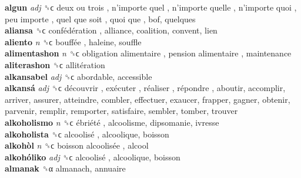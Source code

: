 \textbf{algun} \emph{adj}  ␝ϲ   deux ou trois ,  n’importe quel ,  n’importe quelle ,  n’importe quoi ,  peu importe ,  quel que soit ,  quoi que , bof, quelques  \\
\textbf{aliansa} ␝ϲ   confédération , alliance, coalition, convent, lien  \\
\textbf{aliento} \emph{n}  ␝ϲ   bouffée , haleine, souffle  \\
\textbf{alimentashon} \emph{n}  ␝ϲ   obligation alimentaire ,  pension alimentaire , maintenance  \\
\textbf{aliterashon} ␝ϲ   allitération   \\
\textbf{alkansabel} \emph{adj}  ␝ϲ  abordable, accessible  \\
\textbf{alkansá} \emph{adj}  ␝ϲ   découvrir ,  exécuter ,  réaliser ,  répondre , aboutir, accomplir, arriver, assurer, atteindre, combler, effectuer, exaucer, frapper, gagner, obtenir, parvenir, remplir, remporter, satisfaire, sembler, tomber, trouver  \\
\textbf{alkoholismo} \emph{n}  ␝ϲ   ébriété , alcoolisme, dipsomanie, ivresse  \\
\textbf{alkoholista} ␝ϲ   alcoolisé , alcoolique, boisson  \\
\textbf{alkohòl} \emph{n}  ␝ϲ   boisson alcoolisée , alcool  \\
\textbf{alkohóliko} \emph{adj}  ␝ϲ   alcoolisé , alcoolique, boisson  \\
\textbf{almanak} ␝α  almanach, annuaire  \\
